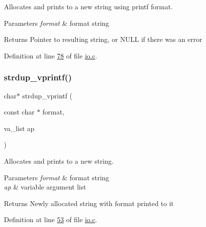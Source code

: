 Allocates and prints to a new string using printf format. 


\begin{DoxyParams}{Parameters}
{\em format} & format string \\
\hline
\end{DoxyParams}
\begin{DoxyReturn}{Returns}
Pointer to resulting string, or N\+U\+LL if there was an error 
\end{DoxyReturn}


Definition at line \hyperlink{io_8c_source_l00078}{78} of file \hyperlink{io_8c_source}{io.\+c}.

\mbox{\label{group__mat__util_ga2b342987d3b664345cb233640b611fe9}} 
\subsubsection{\texorpdfstring{strdup\+\_\+vprintf()}{strdup\_vprintf()}}
{\footnotesize\ttfamily char$\ast$ strdup\+\_\+vprintf (\begin{DoxyParamCaption}\item[{const char $\ast$}]{format,  }\item[{va\+\_\+list}]{ap }\end{DoxyParamCaption})}



Allocates and prints to a new string. 


\begin{DoxyParams}{Parameters}
{\em format} & format string \\
\hline
{\em ap} & variable argument list \\
\hline
\end{DoxyParams}
\begin{DoxyReturn}{Returns}
Newly allocated string with format printed to it 
\end{DoxyReturn}


Definition at line \hyperlink{io_8c_source_l00053}{53} of file \hyperlink{io_8c_source}{io.\+c}.

